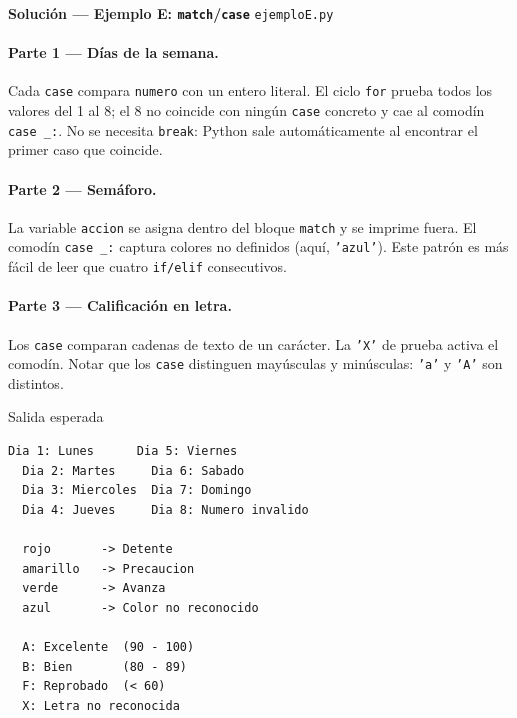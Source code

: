 \documentclass[12pt,a4paper]{article}
\begin{document}
\newpage
\begin{solucionbanner}
  {\large\bfseries\color{solColor} Solución — Ejemplo E: \texttt{match}/\texttt{case}}
  \hfill \texttt{ejemploE.py}
\end{solucionbanner}

\vspace{0.8em}


\vspace{0.8em}
\paragraph{Parte 1 — Días de la semana.}
Cada \texttt{case} compara \texttt{numero} con un entero literal.
El ciclo \texttt{for} prueba todos los valores del 1 al 8; el 8 no coincide
con ningún \texttt{case} concreto y cae al comodín \texttt{case \_:}.
No se necesita \texttt{break}: Python sale automáticamente al encontrar
el primer caso que coincide.

\paragraph{Parte 2 — Semáforo.}
La variable \texttt{accion} se asigna dentro del bloque \texttt{match} y
se imprime fuera.  El comodín \texttt{case \_:} captura colores no definidos
(aquí, \texttt{'azul'}).  Este patrón es más fácil de leer que cuatro
\texttt{if/elif} consecutivos.

\paragraph{Parte 3 — Calificación en letra.}
Los \texttt{case} comparan cadenas de texto de un carácter.
La \texttt{'X'} de prueba activa el comodín.  Notar que los \texttt{case}
distinguen mayúsculas y minúsculas: \texttt{'a'} y \texttt{'A'} son distintos.

\vspace{0.6em}
\begin{salidabox}{Salida esperada}
\begin{lstlisting}[style=OutputStyle]
  Dia 1: Lunes      Dia 5: Viernes
  Dia 2: Martes     Dia 6: Sabado
  Dia 3: Miercoles  Dia 7: Domingo
  Dia 4: Jueves     Dia 8: Numero invalido

  rojo       -> Detente
  amarillo   -> Precaucion
  verde      -> Avanza
  azul       -> Color no reconocido

  A: Excelente  (90 - 100)
  B: Bien       (80 - 89)
  F: Reprobado  (< 60)
  X: Letra no reconocida
\end{lstlisting}
\end{salidabox}
\end{document}
